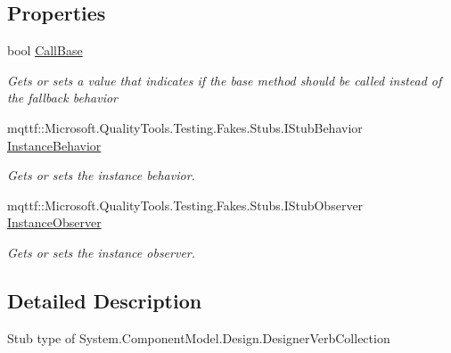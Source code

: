 \subsection*{Properties}
\begin{DoxyCompactItemize}
\item 
bool \hyperlink{class_system_1_1_component_model_1_1_design_1_1_fakes_1_1_stub_designer_verb_collection_a9b761a995f4f3d0c8187b7da4b033518}{Call\-Base}
\begin{DoxyCompactList}\small\item\em Gets or sets a value that indicates if the base method should be called instead of the fallback behavior\end{DoxyCompactList}\item 
mqttf\-::\-Microsoft.\-Quality\-Tools.\-Testing.\-Fakes.\-Stubs.\-I\-Stub\-Behavior \hyperlink{class_system_1_1_component_model_1_1_design_1_1_fakes_1_1_stub_designer_verb_collection_aa108f04bf4c7098f0c67b674cc6da659}{Instance\-Behavior}
\begin{DoxyCompactList}\small\item\em Gets or sets the instance behavior.\end{DoxyCompactList}\item 
mqttf\-::\-Microsoft.\-Quality\-Tools.\-Testing.\-Fakes.\-Stubs.\-I\-Stub\-Observer \hyperlink{class_system_1_1_component_model_1_1_design_1_1_fakes_1_1_stub_designer_verb_collection_a0b02ed949f7e2e5ee430402625fd7987}{Instance\-Observer}
\begin{DoxyCompactList}\small\item\em Gets or sets the instance observer.\end{DoxyCompactList}\end{DoxyCompactItemize}


\subsection{Detailed Description}
Stub type of System.\-Component\-Model.\-Design.\-Designer\-Verb\-Collection



